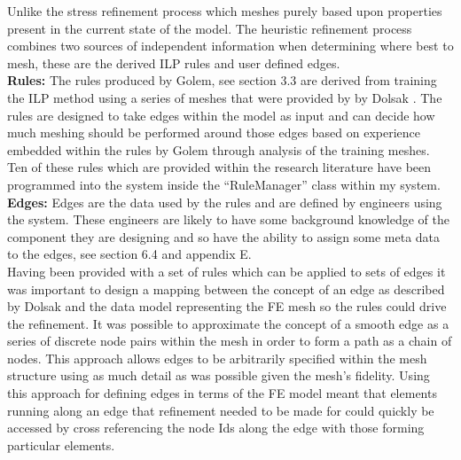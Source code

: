 \noindent
Unlike the stress refinement process which meshes purely based upon properties present in the current state of the model. The heuristic refinement process combines two sources of independent information when determining where best to mesh, these are the derived ILP rules and user defined edges. \\ 

\noindent
\textbf{Rules: } The rules produced by Golem, see section 3.3 are derived from training the ILP method using a series of meshes that were provided by by Dolsak \cite{DolsakPaper91, appOfILPToFEMeshDesign}. The rules are designed to take edges within the model as input and can decide how much meshing should be performed around those edges based on experience embedded within the rules by Golem through analysis of the training meshes. Ten of these rules which are provided within the research literature \cite{DolsakPaper91, appOfILPToFEMeshDesign} have been programmed into the system inside the ``RuleManager'' class within my system. \\ 

\noindent
\textbf{Edges: } Edges are the data used by the rules and are defined by engineers using the system. These engineers are likely to have some background knowledge of the component they are designing and so have the ability to assign some meta data to the edges, see section 6.4 and appendix E.\\ 


\noindent
Having been provided with a set of rules which can be applied to sets of edges it was important to design a mapping between the concept of an edge as described by Dolsak and the data model representing the FE mesh so the rules could drive the refinement. It was possible to approximate the concept of a smooth edge as a series of discrete node pairs within the mesh in order to form a path as a chain of nodes. This approach allows edges to be arbitrarily specified within the mesh structure using as much detail as was possible given the mesh's fidelity. Using this approach for defining edges in terms of the FE model meant that elements running along an edge that refinement needed to be made for could quickly be accessed by cross referencing the node Ids along the edge with those forming particular elements. \\ 



